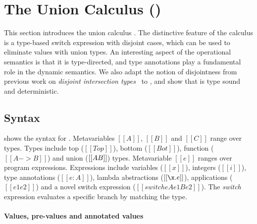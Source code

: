 \section{The Union Calculus (\name)}
\label{sec:union}

This section introduces the union calculus \name. The distinctive feature
of the \name calculus is a type-based switch expression with disjoint
cases, which can be used to eliminate values with union types.
An interesting aspect of the operational
semantics is that it is type-directed,
and type annotations
play a fundamental role in the dynamic semantics.
We also adapt the notion of disjointness from previous work on
\emph{disjoint intersection types}~\cite{oliveira2016disjoint} to \name, and show that \name is type
sound and deterministic.


\subsection{Syntax}\label{sec:union:syntax}
 shows the syntax for \cal. Metavariables
$[[A]]$, $[[B]]$ and $[[C]]$ range over types.  Types include top ($[[Top]]$),
bottom ($[[Bot]]$), function ($[[A -> B]]$) and union ($[[A \/ B]]$)
types. Metavariable $[[e]]$ ranges over program
expressions. Expressions include variables ($[[x]]$), integers
($[[i]]$), type annotations ($[[e:A]]$), lambda abstractions
($[[\x.e]]$), applications ($[[e1 e2]]$) and a novel switch expression ($[[switch
    e A e1 B e2]]$). The \emph{switch} expression evaluates a specific branch by matching the
type.

\paragraph{Values, pre-values and annotated values}

